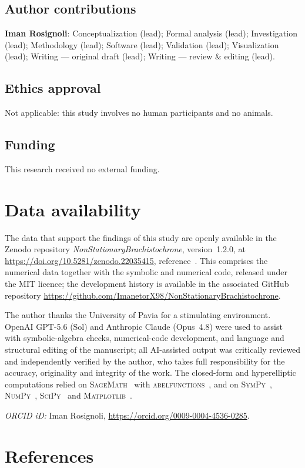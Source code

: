 \documentclass[12pt]{iopart}
\theoremstyle{plain}
\theoremstyle{definition}
\theoremstyle{plain}
\theoremstyle{remark}
\begin{document}
\subsection*{Author contributions}
\textbf{Iman Rosignoli}: Conceptualization (lead); Formal analysis (lead); Investigation
(lead); Methodology (lead); Software (lead); Validation (lead); Visualization (lead);
Writing --- original draft (lead); Writing --- review \& editing (lead).

\subsection*{Ethics approval}
Not applicable: this study involves no human participants and no animals.

\subsection*{Funding}
This research received no external funding.

\section*{Data availability}
The data that support the findings of this study are openly available in the Zenodo
repository \emph{NonStationaryBrachistochrone}, version~1.2.0, at
\url{https://doi.org/10.5281/zenodo.22035415}, reference~\cite{Rosignoli2026CodeJMP}. This
comprises the numerical data together with the symbolic and numerical code, released under
the MIT licence; the development history is available in the associated GitHub repository
\url{https://github.com/ImanetorX98/NonStationaryBrachistochrone}.

\ack
The author thanks the University of Pavia for a stimulating environment. OpenAI
GPT-5.6 (Sol) and Anthropic Claude (Opus~4.8) were used to assist with symbolic-algebra
checks, numerical-code development, and language and structural editing of the manuscript;
all AI-assisted output was critically reviewed and independently verified by the author,
who takes full responsibility for the accuracy, originality and integrity of the work. The
closed-form and hyperelliptic computations relied on \textsc{SageMath}~\cite{SageMath}
with \textsc{abelfunctions}~\cite{abelfunctions}, and on
\textsc{SymPy}~\cite{SymPy}, \textsc{NumPy}~\cite{NumPy}, \textsc{SciPy}~\cite{SciPy} and
\textsc{Matplotlib}~\cite{Matplotlib}.

\medskip\noindent\textit{ORCID iD:} Iman Rosignoli,
\url{https://orcid.org/0009-0004-4536-0285}.

\section*{References}


\end{document}
